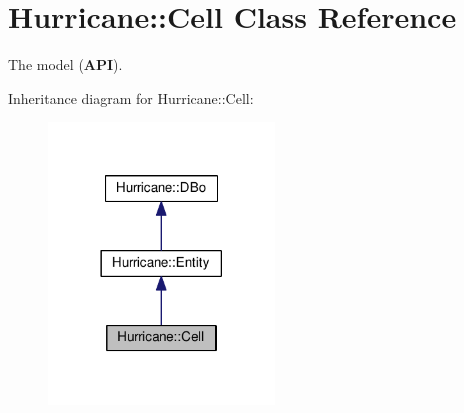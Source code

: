 \hypertarget{classHurricane_1_1Cell}{\section{Hurricane\-:\-:Cell Class Reference}
\label{classHurricane_1_1Cell}
}


The model ({\bfseries A\-P\-I}).  




Inheritance diagram for Hurricane\-:\-:Cell\-:\nopagebreak
\begin{figure}[H]
\begin{center}
\leavevmode
\includegraphics[width=170pt]{classHurricane_1_1Cell__inherit__graph}
\end{center}
\end{figure}
